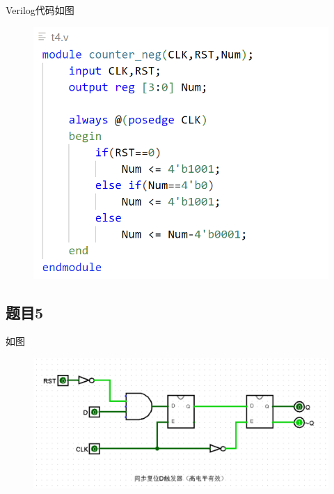\documentclass{article}
\begin{document}
    Verilog代码如图
    \begin{figure}[htbp]
        \centering
        \includegraphics[scale=0.6]{t4v.png}
    \end{figure}
    \clearpage
    \subsection*{题目5} 
    如图
    \begin{figure}[htbp]
        \centering
        \includegraphics[scale=0.6]{t5.png}
    \end{figure}
\end{document}
